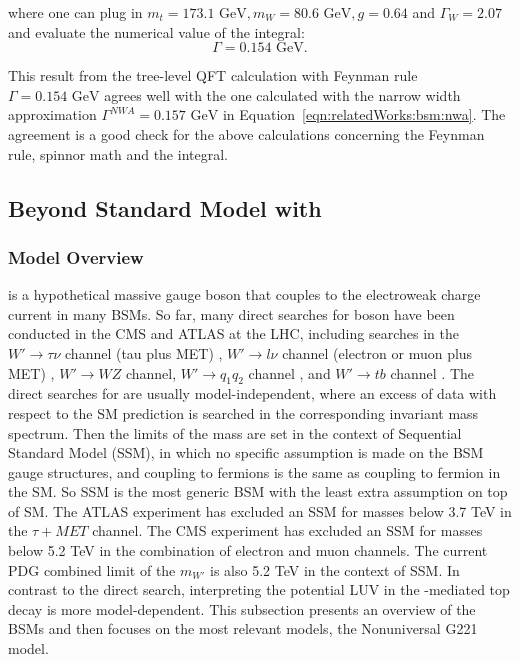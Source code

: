 \noindent where one can plug in $m_t= 173.1 \text{ GeV}, m_W= 80.6 \text{ GeV}, g=0.64 $  and $\Gamma_W = 2.07$ and evaluate the numerical value of the integral:
\begin{equation}
         \Gamma = 0.154 \text{ GeV} .
\end{equation} 


\noindent This result from the tree-level QFT calculation with Feynman rule  $\Gamma = 0.154 \text{ GeV} $ agrees well with the one calculated with the narrow width approximation $\Gamma^{NWA} = 0.157 \text{ GeV} $ in Equation~\ref{eqn:relatedWorks:bsm:nwa}. The agreement is a good check for the above calculations concerning the Feynman rule, spinnor math and the integral.





 
\subsection{Beyond Standard Model with \PWpr}
\label{sec:relatedWorks:bsm:WPrime}

\subsubsection{Model Overview}
\PWpr is a hypothetical massive gauge boson that couples to the electroweak charge current in many BSMs. So far, many direct searches for \PWpr boson have been conducted in the CMS and ATLAS at the LHC, including searches in the $W'\to \tau \nu$  channel (tau plus MET) \cite{Sirunyan:2018lbg, Khachatryan:2015pua,Aaboud:2018vgh}, $W'\to l \nu$ channel (electron or muon plus MET) \cite{Sirunyan:2018mpc, Aaboud:2017efa}, $W'\to W Z$ channel\cite{Sirunyan:2018ivv, Aaboud:2017eta}, $W'\to q_1 q_2$ channel \cite{Sirunyan:2016iap, Aaboud:2017yvp}, and $W'\to t b$ channel \cite{Sirunyan:2017vkm, Aaboud:2018juj}. The direct searches for \PWpr are usually model-independent, where an excess of data with respect to the SM prediction is searched in the corresponding invariant mass spectrum. Then the limits of the \PWpr mass are set in the context of Sequential Standard Model (SSM), in which no specific assumption is made on the BSM gauge structures, and \PWpr coupling to fermions is the same as \PW coupling to fermion in the SM. So SSM is the most generic \PWpr BSM with the least extra assumption on top of SM. The ATLAS experiment has excluded an SSM \PWpr for masses below 3.7 TeV in the $\tau+MET$ channel. The CMS experiment has excluded an SSM \PWpr for masses below 5.2 TeV in the combination of electron and muon channels. The current PDG combined limit of the $m_{W'}$ is also 5.2 TeV in the context of SSM. In contrast to the direct search, interpreting the potential LUV in the \PWpr-mediated top decay is more model-dependent. This subsection presents an overview of the \PWpr BSMs and then focuses on the most relevant \PWpr models, the Nonuniversal G221 model.




